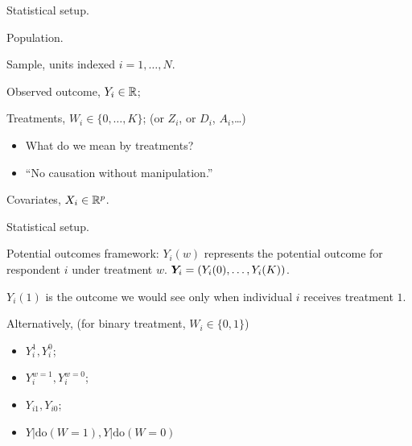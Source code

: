 \documentclass[xcolor={dvipsnames}, handout]{beamer}
\begin{document}
\begin{frame}{Statistical setup.}

\begin{wideitemize}
\item Population. \pause
\item Sample, units indexed $i = 1, \dots, N$.\pause
\item Observed outcome, $Y_i\in {\mathbb R}$;\pause
\item Treatments, $W_i \in \{0, \dots, K\}$; \pause (or $Z_i$, or $D_i$, $A_i$,\dots)\pause
\begin{itemize}
\item What do we mean by treatments? \pause
\item ``No causation without manipulation.'' \citep{holland1986}\pause
\end{itemize}
\item Covariates, $X_i \in {\mathbb R}^p$.
\end{wideitemize}

\end{frame}



\begin{frame}{Statistical setup.}

\begin{wideitemize}
\item Potential outcomes framework: $Y_i(w)$ represents the potential outcome for respondent $i$ under treatment $w$. \pause $\bm{Y}_i = (Y_i(0), \dots, Y_i(K))$.\pause
\item $Y_i(1)$ is the outcome we would see only when individual $i$ receives treatment $1$. \pause
\item Alternatively, (for binary treatment, $W_i \in\{0,1\}$) 
\begin{itemize}
\item $Y_i^1, Y_i^0$; 
\item $Y_i^{w=1},Y_i^{w=0}$; 
\item $Y_{i1}, Y_{i0}$; 
\item $Y|\textrm{do}(W = 1), Y|\textrm{do}(W = 0)$
\end{itemize}
\end{wideitemize}

\end{frame}
\end{document}
